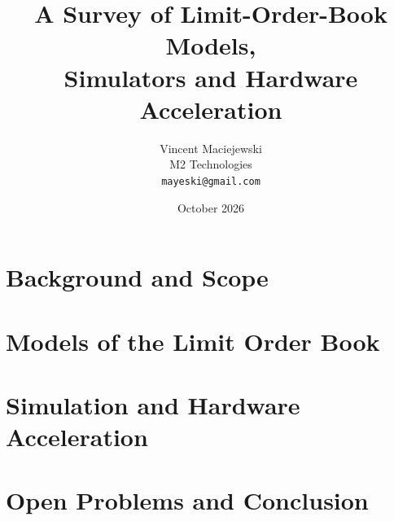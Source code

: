 \documentclass[11pt]{article}
\title{\textbf{A Survey of Limit-Order-Book Models,\\ Simulators and Hardware Acceleration}}
\author{%
  Vincent Maciejewski\\
  \small M2 Technologies\\
  \small \texttt{mayeski@gmail.com}
}
\date{October 2026}
\theoremstyle{example}
\begin{document}
\maketitle



\tableofcontents
\newpage

\part{Background and Scope}


\part{Models of the Limit Order Book}


\part{Simulation and Hardware Acceleration}


\part{Open Problems and Conclusion}


\FloatBarrier
\appendix



\FloatBarrier


\end{document}
